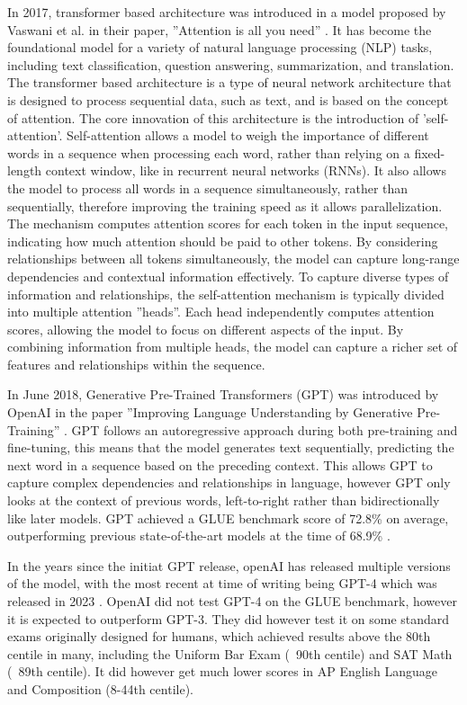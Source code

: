 \documentclass{UoYCSproject}
\begin{document}
    In 2017, transformer based architecture was introduced in a model proposed by Vaswani et al.
    in their paper, ''Attention is all you need'' \cite{vaswani2023attention}.
    It has become the foundational model for a variety of natural language processing (NLP) tasks, including text classification, question answering, summarization, and translation.
    The transformer based architecture is a type of neural network architecture that is designed to process sequential data, such as text, and is based on the concept of attention.
    The core innovation of this architecture is the introduction of 'self-attention'.
    Self-attention allows a model to weigh the importance of different words in a sequence when processing each word, rather than relying on a fixed-length context window, like in recurrent neural networks (RNNs).
    It also allows the model to process all words in a sequence simultaneously, rather than sequentially, therefore improving the training speed as it allows parallelization.
    The mechanism computes attention scores for each token in the input sequence, indicating how much attention should be paid to other tokens.
    By considering relationships between all tokens simultaneously, the model can capture long-range dependencies and contextual information effectively.
    To capture diverse types of information and relationships, the self-attention mechanism is typically divided into multiple attention ''heads''.
    Each head independently computes attention scores, allowing the model to focus on different aspects of the input.
    By combining information from multiple heads, the model can capture a richer set of features and relationships within the sequence.
    \par
    In June 2018, Generative Pre-Trained Transformers (GPT) was introduced by OpenAI in the paper ''Improving Language Understanding by Generative Pre-Training'' \cite{GPT2018}.
    GPT follows an autoregressive approach during both pre-training and fine-tuning, this means that the model generates text sequentially, predicting the next word in a sequence based on the preceding context.
    This allows GPT to capture complex dependencies and relationships in language, however GPT only looks at the context of previous words, left-to-right rather than bidirectionally like later models.
    GPT achieved a GLUE benchmark score of 72.8\% on average, outperforming previous state-of-the-art models at the time of 68.9\% . \par

In the years since the initiat GPT release, openAI has released multiple versions of the model, with the most recent at time of writing being GPT-4 which was released in 2023 \cite{openai2024gpt4}.
OpenAI did not test GPT-4 on the GLUE benchmark, however it is expected to outperform GPT-3.
They did however test it on some standard exams originally designed for humans, which achieved results above the 80th centile in many, including the Uniform Bar Exam (~90th centile) and SAT Math (~89th centile). It did however get much lower scores in AP English Language and Composition (8-44th centile). \cite{openai2024gpt4} \par
\end{document}
